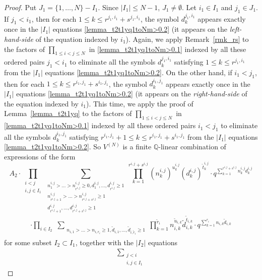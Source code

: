 \documentclass[12pt, reqno]{amsart}
\theoremstyle{definition}
\theoremstyle{remark}
\numberwithin{equation}{section}
\newcommand{\Q}{ \mathbb Q }
\newcommand{\w}{\tilde}
\numberwithin{equation}{section}
\begin{document}
\begin{proof}
Put $J_1 = \{1, \ldots, N\} - I_1$.
Since $|I_1| \le N-1$, $J_1 \ne \emptyset$. 
Let $i_1 \in I_1$ and $j_1 \in J_1$.
If $j_1 < i_1$, then for each $1 \le k \le r^{j_1, i_1}+s^{j_1, i_1}$,
the symbol $d_{k}^{j_1,i_1}$ appears exactly once in 
the $|I_1|$ equations \eqref{lemma_t2t1yq1toNm>0.2} (it appears on 
the {\it left-hand-side} of the equation indexed by $i_1$). 
Again, we apply Remark~\ref{rmk_rs} to 
the factors of $\displaystyle{\prod_{1 \le i < j \le N}}$ in 
\eqref{lemma_t2t1yq1toNm>0.1} indexed by all these ordered pairs $j_1<i_1$ 
to eliminate all the symbols $d_{k}^{j_1, i_1}$ satisfying 
$1 \le k \le r^{j_1, i_1}$ from the $|I_1|$ equations 
\eqref{lemma_t2t1yq1toNm>0.2}. On the other hand, if $i_1 < j_1$, 
then for each $1 \le k \le r^{i_1,j_1}+s^{i_1,j_1}$,
the symbol $d_{k}^{i_1,j_1}$ appears exactly once in the $|I_1|$ equations \eqref{lemma_t2t1yq1toNm>0.2} (it appears on 
the {\it right-hand-side} of the equation indexed by $i_1$). 
This time, we apply the proof of Lemma~\ref{lemma_t2t1yq} to 
the factors of $\displaystyle{\prod_{1 \le i < j \le N}}$ 
in \eqref{lemma_t2t1yq1toNm>0.1} indexed by all these ordered pairs 
$i_1<j_1$ to eliminate all the symbols $d_{k}^{i_1,j_1}$ satisfying 
$r^{i_1,j_1}+ 1 \le k \le r^{i_1,j_1}+s^{i_1,j_1}$ 
from the $|I_1|$ equations \eqref{lemma_t2t1yq1toNm>0.2}. 
So $V^{(N)}$ is 
a finite $\Q$-linear combination of expressions of the form 
$$
A_2 \cdot \prod_{\substack{i < j\\i, j \in I_1}}
\sum_{\substack{n_1^{i,j} > \ldots > n_{r^{i,j}}^{i,j} \ge 0, 
    d_1^{i,j}, \ldots, d_{r^{i,j}}^{i,j} \ge 1\\
    n_{r^{i,j}+1}^{i,j} > \ldots > n_{r^{i,j}+s^{i,j}}^{i,j} \ge 1\\
    d_{r^{i,j}+1}^{i,j}, \ldots, d_{r^{i,j}+s^{i,j}}^{i,j} \ge 1}}
  \prod_{k=1}^{r^{i,j}+s^{i,j}} (n_k^{i,j})^{u_k^{i,j}}
    (d_k^{i,j})^{\hat t_k^{i,j}} 
\cdot q^{\sum_{k=1}^{r^{i,j}+s^{i,j}} n_k^{i,j} d_k^{i,j}}
$$
\begin{eqnarray}    \label{lemma_t2t1yq1toNm>0.3}
\cdot \prod_{i \in I_2} \,\,
\sum_{\substack{n_{i,1} > \ldots > n_{i, r_i} \ge 1, 
    \w d_{i,1}, \ldots, \w d_{i, \w r_i} \ge 1}}
\prod_{k=1}^{\w r_i} n_{i,k}^{\w u_{i,k}} \w d_{i,k}^{\w t_{i,k}} 
\cdot q^{\sum_{k=1}^{r_i} n_{i,k} \w d_{i,k}}
\end{eqnarray}
for some subset $I_2 \subset I_1$, together with the $|I_2|$ equations
\begin{eqnarray}    \label{lemma_t2t1yq1toNm>0.4}
  \sum_{\substack{j < i\\i, j \in I_1}} 

\end{eqnarray}
\end{proof}
\end{document}
